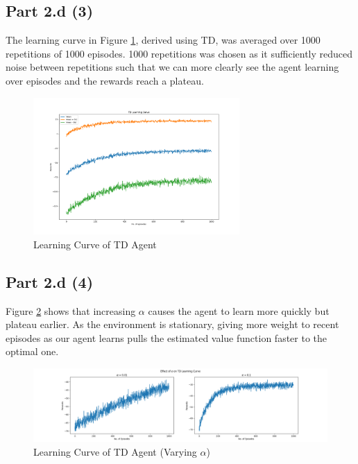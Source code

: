 \documentclass[12pt]{article}
\begin{document}
\subsection*{Part 2.d (3)}

The learning curve in Figure \ref{figure:2d3}, derived using TD, was averaged over 1000 repetitions of 1000 episodes. 1000 repetitions was chosen as it sufficiently reduced noise between repetitions such that we can more clearly see the agent learning over episodes and the rewards reach a plateau.

\begin{figure}[H]
    \centering
    \includegraphics[width=0.7\textwidth]{figures/2d3.png}
    \caption{Learning Curve of TD Agent}
    \label{figure:2d3}
\end{figure}

\subsection*{Part 2.d (4)}

Figure \ref{figure:2d4_alpha} shows that increasing \(\alpha\) causes the agent to learn more quickly but plateau earlier. As the environment is stationary, giving more weight to recent episodes as our agent learns pulls the estimated value function faster to the optimal one.

\begin{figure}[H]
    \centering
    \includegraphics[width=\textwidth]{figures/2d4_alpha.png}
    \caption{Learning Curve of TD Agent (Varying \(\alpha\))}
    \label{figure:2d4_alpha}
\end{figure}
\end{document}
